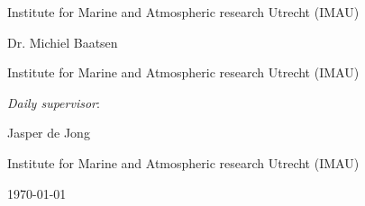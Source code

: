\begin{titlepage}
    Institute for Marine and Atmospheric research Utrecht (IMAU)\par %
    \vspace{0.25cm}
    {\large Dr. Michiel Baatsen\par} %
    Institute for Marine and Atmospheric research Utrecht (IMAU)\par %
    \vspace{0.5cm}
	{\Large\itshape Daily supervisor}:\par\vspace{0.25cm}
    {\large Jasper de Jong\par} %
    Institute for Marine and Atmospheric research Utrecht (IMAU) %

	\vfill
	{\large \today\par}%
    
\end{titlepage}    

\restoregeometry %
